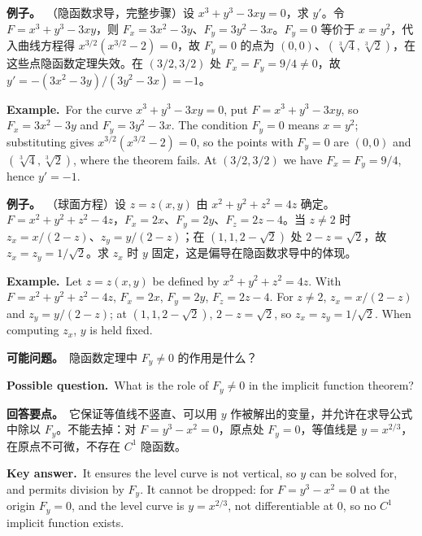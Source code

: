 \documentclass[UTF8,11pt,a4paper]{ctexart}
\newcommand{\EX}[2]{\par\noindent\textbf{例子。}\ #1\par\noindent\textbf{Example.}\ #2\par}
\newcommand{\ASK}[4]{\begin{samepage}\par\noindent\textbf{可能问题。}\ #1\par\noindent\textbf{Possible question.}\ #2\par\noindent\textbf{回答要点。}\ #3\par\noindent\textbf{Key answer.}\ #4\medskip\end{samepage}}
\begin{document}
\EX{（隐函数求导，完整步骤）设 $x^3+y^3-3xy=0$，求 $y'$。令 $F=x^3+y^3-3xy$，则 $F_x=3x^2-3y$、$F_y=3y^2-3x$。$F_y=0$ 等价于 $x=y^2$，代入曲线方程得 $x^{3/2}(x^{3/2}-2)=0$，故 $F_y=0$ 的点为 $(0,0)$、$(\sqrt[3]{4},\sqrt[3]{2})$，在这些点隐函数定理失效。在 $(3/2,3/2)$ 处 $F_x=F_y=9/4\ne0$，故 $y'=-(3x^2-3y)/(3y^2-3x)=-1$。}{For the curve $x^3+y^3-3xy=0$, put $F=x^3+y^3-3xy$, so $F_x=3x^2-3y$ and $F_y=3y^2-3x$. The condition $F_y=0$ means $x=y^2$; substituting gives $x^{3/2}(x^{3/2}-2)=0$, so the points with $F_y=0$ are $(0,0)$ and $(\sqrt[3]{4},\sqrt[3]{2})$, where the theorem fails. At $(3/2,3/2)$ we have $F_x=F_y=9/4$, hence $y'=-1$.}
\EX{（球面方程）设 $z=z(x,y)$ 由 $x^2+y^2+z^2=4z$ 确定。$F=x^2+y^2+z^2-4z$，$F_x=2x$、$F_y=2y$、$F_z=2z-4$。当 $z\ne2$ 时 $z_x=x/(2-z)$、$z_y=y/(2-z)$；在 $(1,1,2-\sqrt2)$ 处 $2-z=\sqrt2$，故 $z_x=z_y=1/\sqrt2$。求 $z_x$ 时 $y$ 固定，这是偏导在隐函数求导中的体现。}{Let $z=z(x,y)$ be defined by $x^2+y^2+z^2=4z$. With $F=x^2+y^2+z^2-4z$, $F_x=2x$, $F_y=2y$, $F_z=2z-4$. For $z\ne2$, $z_x=x/(2-z)$ and $z_y=y/(2-z)$; at $(1,1,2-\sqrt2)$, $2-z=\sqrt2$, so $z_x=z_y=1/\sqrt2$. When computing $z_x$, $y$ is held fixed.}
\ASK{隐函数定理中 $F_y\ne0$ 的作用是什么？}{What is the role of $F_y\ne0$ in the implicit function theorem?}{它保证等值线不竖直、可以用 $y$ 作被解出的变量，并允许在求导公式中除以 $F_y$。不能去掉：对 $F=y^3-x^2=0$，原点处 $F_y=0$，等值线是 $y=x^{2/3}$，在原点不可微，不存在 $C^1$ 隐函数。}{It ensures the level curve is not vertical, so $y$ can be solved for, and permits division by $F_y$. It cannot be dropped: for $F=y^3-x^2=0$ at the origin $F_y=0$, and the level curve is $y=x^{2/3}$, not differentiable at $0$, so no $C^1$ implicit function exists.}
\end{document}
